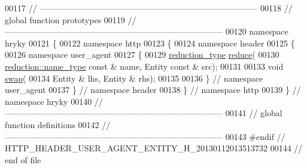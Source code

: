 \begin{DoxyCode}
00117 \textcolor{comment}{//
      ------------------------------------------------------------------------------}
00118 \textcolor{comment}{// global function prototypes}
00119 \textcolor{comment}{//
      ------------------------------------------------------------------------------}
00120 \textcolor{keyword}{namespace }hryky
00121 \{
00122 \textcolor{keyword}{namespace }http
00123 \{
00124 \textcolor{keyword}{namespace }header
00125 \{
00126 \textcolor{keyword}{namespace }user\_agent
00127 \{
00129     \hyperlink{namespacehryky_a343a9a4c36a586be5c2693156200eadc}{reduction_type} \hyperlink{namespacehryky_1_1http_a08fc36a78a8e2908140fcd102829a566}{reduce}(
00130         \hyperlink{namespacehryky_1_1reduction_ac686c30a4c8d196bbd0f05629a6b921f}{reduction::name_type} \textcolor{keyword}{const} & name, Entity \textcolor{keyword}{const} & src);
00131 
00133     \textcolor{keywordtype}{void} \hyperlink{namespacehryky_1_1http_a38e62595ad532d18fbc65ceb61973aec}{swap}(
00134         Entity & lhs, Entity & rhs);
00135 
00136 \} \textcolor{comment}{// namespace user\_agent}
00137 \} \textcolor{comment}{// namespace header}
00138 \} \textcolor{comment}{// namespace http}
00139 \} \textcolor{comment}{// namespace hryky}
00140 \textcolor{comment}{//
      ------------------------------------------------------------------------------}
00141 \textcolor{comment}{// global function definitions}
00142 \textcolor{comment}{//
      ------------------------------------------------------------------------------}
00143 \textcolor{preprocessor}{#endif // HTTP\_HEADER\_USER\_AGENT\_ENTITY\_H\_20130112013513732}
00144 \textcolor{preprocessor}{}\textcolor{comment}{// end of file}
\end{DoxyCode}
